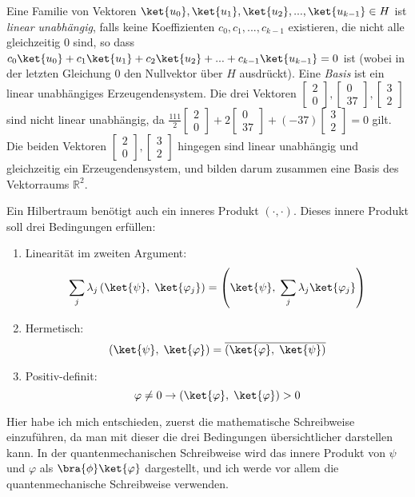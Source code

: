 Eine Familie von Vektoren $\ket{u_0}, \ket{u_1}, \ket{u_2}, ..., \ket{u_{k - 1}} \in H$ ist \textit{linear unabhängig}, falls keine Koeffizienten $c_0, c_1, ..., c_{k - 1}$ existieren, die nicht alle gleichzeitig $0$ sind, so dass $c_0\ket{u_0} + c_1\ket{u_1} + c_2\ket{u_2} + ... + c_{k - 1}\ket{u_{k - 1}} = 0$ ist (wobei in der letzten Gleichung 0 den Nullvektor über $H$ ausdrückt). Eine \textit{Basis} ist ein linear unabhängiges Erzeugendensystem. Die drei Vektoren $\begin{bmatrix}2 \\ 0\end{bmatrix}, \begin{bmatrix} 0 \\ 37\end{bmatrix}, \begin{bmatrix}3 \\ 2\end{bmatrix}$ sind nicht linear unabhängig, da $\frac{111}{2}\begin{bmatrix}2 \\ 0\end{bmatrix} + 2\begin{bmatrix} 0 \\ 37\end{bmatrix} + (-37)\begin{bmatrix}3 \\ 2\end{bmatrix} = 0$ gilt. Die beiden Vektoren $\begin{bmatrix}2 \\ 0\end{bmatrix}, \begin{bmatrix}3 \\ 2\end{bmatrix}$ hingegen sind linear unabhängig und gleichzeitig ein Erzeugendensystem, und bilden darum zusammen eine Basis des Vektorraums $\mathbb{R}^2$.

Ein Hilbertraum benötigt auch ein inneres Produkt $\left( \cdot, \cdot \right)$. Dieses innere Produkt soll drei Bedingungen erfüllen:
\begin{enumerate}
    \item Linearität im zweiten Argument: $$\sum_j\lambda_j\left(\ket{\psi}, \; \ket{\varphi_j}\right) = \left(\ket{\psi}, \; \sum_j\lambda_j\ket{\varphi_j}\right)$$
    \item Hermetisch: $$\left(\ket{\psi}, \; \ket{\varphi} \right) = \overline{\left(\ket{\varphi} , \; \ket{\psi}\right)}$$
    \item Positiv-definit: $$\varphi \neq 0 \rightarrow \left( \ket{\varphi}, \; \ket{\varphi} \right) > 0$$
\end{enumerate}
Hier habe ich mich entschieden, zuerst die mathematische Schreibweise einzuführen, da man mit dieser die drei Bedingungen übersichtlicher darstellen kann. In der quantenmechanischen Schreibweise wird das innere Produkt von $\psi$ und $\varphi$ als $\bra{\phi}\ket{\varphi}$ dargestellt, und ich werde vor allem die quantenmechanische Schreibweise verwenden.

